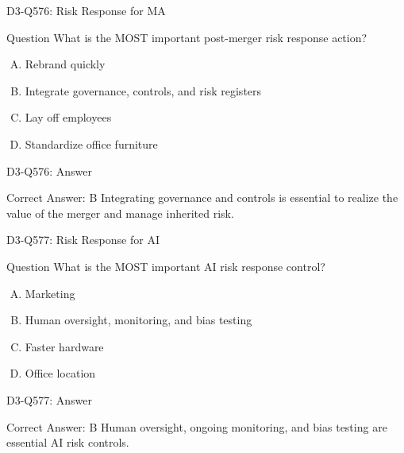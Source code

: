 \documentclass{beamer}
\begin{document}
	\begin{frame}{D3-Q576: Risk Response for MA}
		\begin{block}{Question}
			What is the MOST important post-merger risk response action?
		\end{block}
		\begin{enumerate}[(A)]
			\item Rebrand quickly
			\item Integrate governance, controls, and risk registers
			\item Lay off employees
			\item Standardize office furniture
		\end{enumerate}
	\end{frame}
	\begin{frame}{D3-Q576: Answer}
		\begin{block}{Correct Answer: B}
			Integrating governance and controls is essential to realize the value of the merger and manage inherited risk.
		\end{block}
	\end{frame}
	
	\begin{frame}{D3-Q577: Risk Response for AI}
		\begin{block}{Question}
			What is the MOST important AI risk response control?
		\end{block}
		\begin{enumerate}[(A)]
			\item Marketing
			\item Human oversight, monitoring, and bias testing
			\item Faster hardware
			\item Office location
		\end{enumerate}
	\end{frame}
	\begin{frame}{D3-Q577: Answer}
		\begin{block}{Correct Answer: B}
			Human oversight, ongoing monitoring, and bias testing are essential AI risk controls.
		\end{block}
	\end{frame}
	
\end{document}
